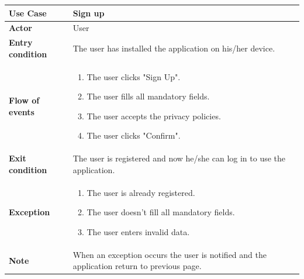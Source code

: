 \documentclass[../main.tex]{subfiles}
\begin{document}
	\begin{center}
		\begin{tabular}{p{3cm}p{8.28cm}}
			\hline
			\textbf{Use Case} & Sign up\\
			\hline
			\textbf{Actor} & User\\
			\hline
			\textbf{Entry condition} & The user has installed the application on his/her device.\\
			\hline
			\textbf{Flow of events} & \begin{enumerate}
				\linespread{0}\item The user clicks "Sign Up".
				\linespread{0}\item The user fills all mandatory fields.
				\linespread{0}\item The user accepts the privacy policies.
				\linespread{0}\item The user clicks "Confirm".
			\end{enumerate}\\
			\hline
			\textbf{Exit condition} & The user is registered and now he/she can log in to use the application.\\
			\hline
			\textbf{Exception} & \begin{enumerate}
				\linespread{0}\item The user is already registered.
				\linespread{0}\item The user doesn't fill all mandatory fields.
				\linespread{0}\item The user enters invalid data.
			\end{enumerate}\\
			\hline
			\textbf{Note} & When an exception occurs the user is notified and the application return to previous page.\\
			\hline
		\end{tabular}
	\end{center}
	\vspace*{3cm}
\end{document}
